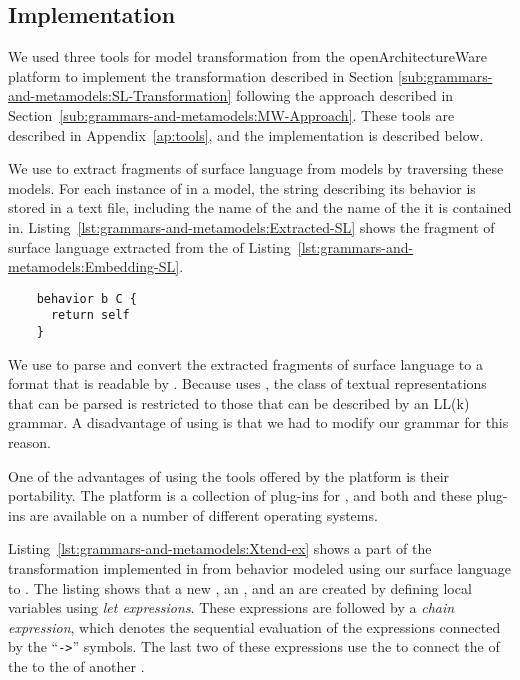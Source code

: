 \subsection{Implementation}
\label{sub:grammars-and-metamodels:MW-Implementation}
We used three tools for model transformation from the openArchitectureWare platform to implement the transformation described in Section \ref{sub:grammars-and-metamodels:SL-Transformation} following the approach described in Section~\ref{sub:grammars-and-metamodels:MW-Approach}.
These tools are described in Appendix~\ref{ap:tools}, and the implementation is described below.

We use \Xpand to extract fragments of surface language from models by traversing these models.
For each instance of \OpaqueBehavior in a model, the string describing its behavior is stored in a text file, including the name of the \OpaqueBehavior and the name of the \Class it is contained in.
Listing~\ref{lst:grammars-and-metamodels:Extracted-SL} shows the fragment of surface language extracted from the \OpaqueBehavior of Listing~\ref{lst:grammars-and-metamodels:Embedding-SL}.

\lstset{
    language=sl,
    label=lst:grammars-and-metamodels:Extracted-SL,
    caption=Extracted fragment of surface language,
    numbers=none
}

\begin{listing}
  \begin{lstlisting}
    behavior b C {
      return self
    }
  \end{lstlisting}
\end{listing}

We use \Xtext to parse and convert the extracted fragments of surface language to a format that is readable by \Xtend.
Because \Xtext uses \ANTLR, the class of textual representations that can be parsed is restricted to those that can be described by an LL(k) grammar.
A disadvantage of using \Xtext is that we had to modify our grammar for this reason.

One of the advantages of using the tools offered by the \OAW platform is their portability.
The platform is a collection of plug-ins for \Eclipse, and both \Eclipse and these plug-ins are available on a number of different operating systems.

Listing~\ref{lst:grammars-and-metamodels:Xtend-ex} shows a part of the transformation implemented in \Xtend from behavior modeled using our surface language to \Activities.
The listing shows that a new \ReadVariableAction, an \OutputPin, and an \ObjectFlow are created by defining local variables using \emph{let expressions}.
These expressions are followed by a \emph{chain expression}, which denotes the sequential evaluation of the expressions connected by the ``\texttt{->}'' symbols. The last two of these expressions use the \ObjectFlow to connect the \OutputPin of the \ReadVariableAction to the \InputPin of another \Action.

